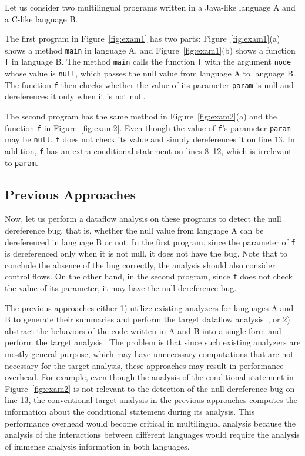 Let us consider two multilingual programs written in a Java-like language A
and a C-like language B.

The first program in Figure~\ref{fig:exam1} has two parts:
Figure~\ref{fig:exam1}(a) shows a method \texttt{main} in language A,
and Figure~\ref{fig:exam1}(b) shows a function \texttt{f} in language B.
The method \texttt{main} calls the function \texttt{f} with the argument
\texttt{node} whose value is \texttt{null}, which passes the null
value from language A to language B. The function \texttt{f} then
checks whether the value of its parameter \texttt{param} is null
and dereferences it only when it is not null.

The second program has the same method in Figure~\ref{fig:exam2}(a)
and the function \texttt{f} in Figure~\ref{fig:exam2}.
Even though the value of \texttt{f}'s parameter \texttt{param} may be \texttt{null},
\texttt{f} does not check its value and simply dereferences it on line 13.
In addition, \texttt{f} has an extra conditional statement on lines 8--12,
which is irrelevant to \texttt{param}.

\subsection{Previous Approaches}
Now, let us perform a dataflow analysis on these programs to detect
the null dereference bug, that is, whether the null value from
language A can be dereferenced in language B or not.
In the first program, since the parameter of \texttt{f} is
dereferenced only when it is not null, it does not have the bug.
Note that to conclude the absence of the bug correctly,
the analysis should also consider control flows.
On the other hand, in the second program, since \texttt{f} does not
check the value of its parameter, it may have the null dereference bug.

The previous approaches either 1) utilize existing analyzers for
languages A and B to generate their summaries and perform the
target dataflow analysis~\cite{LeeASE20,JN-SAF}, or 2) abstract 
the behaviors of the code written in A and B into a single form and
perform the target analysis~\cite{hybridroid,cpython}
The problem is that since such existing analyzers are mostly general-purpose,
which may have unnecessary computations that are not necessary for the target analysis,
these approaches may result in performance overhead.
For example, even though the analysis of the conditional statement in Figure~\ref{fig:exam2}
is not relevant to the detection of the null dereference bug on line 13,
the conventional target analysis in the previous approaches computes
the information about the conditional statement during its analysis.
This performance overhead would become critical in multilingual analysis
because the analysis of the interactions between different languages would require
the analysis of immense analysis information in both languages.


